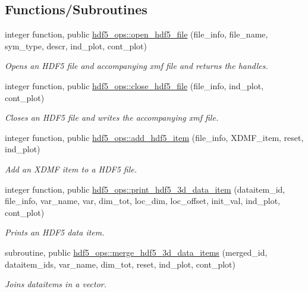 \subsection*{Functions/\+Subroutines}
\begin{DoxyCompactItemize}
\item 
integer function, public \hyperlink{namespacehdf5__ops_a72c3974bb01858e1b232fc888d387bb6}{hdf5\+\_\+ops\+::open\+\_\+hdf5\+\_\+file} (file\+\_\+info, file\+\_\+name, sym\+\_\+type, descr, ind\+\_\+plot, cont\+\_\+plot)
\begin{DoxyCompactList}\small\item\em Opens an H\+D\+F5 file and accompanying xmf file and returns the handles. \end{DoxyCompactList}\item 
integer function, public \hyperlink{namespacehdf5__ops_ad6c53fff55bd71f63470ca1e525ddb56}{hdf5\+\_\+ops\+::close\+\_\+hdf5\+\_\+file} (file\+\_\+info, ind\+\_\+plot, cont\+\_\+plot)
\begin{DoxyCompactList}\small\item\em Closes an H\+D\+F5 file and writes the accompanying xmf file. \end{DoxyCompactList}\item 
integer function, public \hyperlink{namespacehdf5__ops_ade36dbd73b60da30e33a1059e590f734}{hdf5\+\_\+ops\+::add\+\_\+hdf5\+\_\+item} (file\+\_\+info, X\+D\+M\+F\+\_\+item, reset, ind\+\_\+plot)
\begin{DoxyCompactList}\small\item\em Add an X\+D\+MF item to a H\+D\+F5 file. \end{DoxyCompactList}\item 
integer function, public \hyperlink{namespacehdf5__ops_ad794d069ca355f28536fba7e0d21bc13}{hdf5\+\_\+ops\+::print\+\_\+hdf5\+\_\+3d\+\_\+data\+\_\+item} (dataitem\+\_\+id, file\+\_\+info, var\+\_\+name, var, dim\+\_\+tot, loc\+\_\+dim, loc\+\_\+offset, init\+\_\+val, ind\+\_\+plot, cont\+\_\+plot)
\begin{DoxyCompactList}\small\item\em Prints an H\+D\+F5 data item. \end{DoxyCompactList}\item 
subroutine, public \hyperlink{namespacehdf5__ops_a7b18b66402089eef2288b2d532f6af5d}{hdf5\+\_\+ops\+::merge\+\_\+hdf5\+\_\+3d\+\_\+data\+\_\+items} (merged\+\_\+id, dataitem\+\_\+ids, var\+\_\+name, dim\+\_\+tot, reset, ind\+\_\+plot, cont\+\_\+plot)
\begin{DoxyCompactList}\small\item\em Joins dataitems in a vector. \end{DoxyCompactList}\item 

\end{DoxyCompactItemize}
